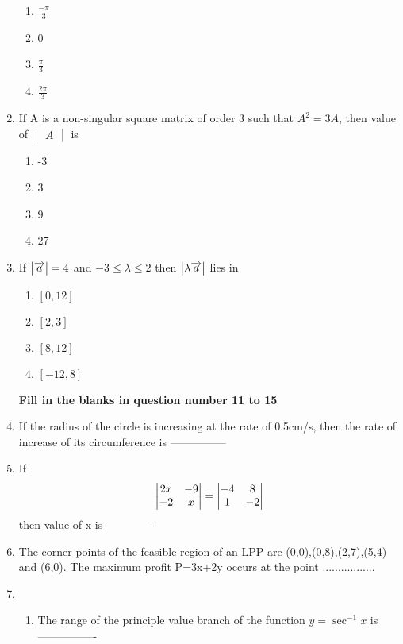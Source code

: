 \documentclass[journal,12pt,twocolumn]{IEEEtran}
\renewcommand\thesection{\arabic{section}}
\begin{document}
\begin{enumerate}[label=\thesection.\arabic*.,ref=\thesection.\theenumi]
\begin{enumerate}
    \item $\frac{-\pi}{3}$
    \item 0
    \item $\frac{\pi}{3}$
    \item $\frac{2\pi}{3}$
\end{enumerate}

\item  If A is a non-singular square matrix of order 3 such that $ A^2 =3A $, then value of  $\begin{vmatrix}A \end{vmatrix}$ is

\begin{enumerate}
    \item -3
     \item 3
     \item 9
     \item 27
\end{enumerate}
\item  If $\begin{vmatrix}\overrightarrow{a}\end{vmatrix} = 4 $ and  $ -3\leq \lambda \leq 2 $ then $\begin{vmatrix}\lambda \overrightarrow{a}\end{vmatrix} $ lies in

\begin{enumerate}
    \item $\left[0,12\right]$
    \item $\left[2,3\right]$
    \item $\left[8,12\right]$
    \item $\left[-12,8\right]$
\end{enumerate}
\pagebreak
\textbf{Fill in the blanks in question number 11 to 15}\\

\item  If the radius of the circle is increasing at the rate of 0.5cm/s, then the rate of increase of its circumference is ---------------\\
\item  If \begin{align} \begin{vmatrix}2x & -9 \\ -2 & x\end{vmatrix}  = \begin{vmatrix}-4 & 8 \\ 1 & -2 \end{vmatrix} \nonumber \end{align} then value of x is -------------\\
\item  The corner points of the feasible region of an LPP are (0,0),(0,8),(2,7),(5,4) and (6,0). The maximum profit P=3x+2y occurs at the point .................\\
\item \begin{enumerate} \item The range of the principle value branch of the function $ y= \sec^{-1}x $ is ----------------
    

\end{enumerate}
\end{enumerate}
\end{document}
